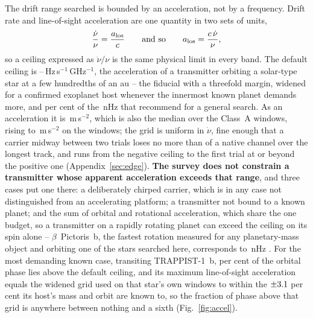 The drift range searched is bounded by an acceleration, not by a frequency.
Drift rate and line-of-sight acceleration are one quantity in two sets of
units,
%
\begin{equation}
\frac{\dot\nu}{\nu}=\frac{a_{\rm los}}{c}
\qquad\text{and so}\qquad
a_{\rm los}=\frac{c\,\dot\nu}{\nu},
\label{eq:accel}
\end{equation}
%
so a ceiling expressed as $\dot\nu/\nu$ is the same physical limit in every
band. The default ceiling is \DriftCeilLo--\DriftCeilHi\,Hz\,s$^{-1}$\,GHz$^{-1}$,
the acceleration of a transmitter orbiting a solar-type star at a few
hundredths of an au -- the \citet{Mason2025} fiducial with a threefold margin,
widened for a confirmed exoplanet host whenever the innermost known planet
demands more, and \AccelSheikhPct{} per cent of the \AccelSheikhNHz\,nHz that
\citet{Sheikh2019} recommend for a general search. As an acceleration it is
\AccelCeilMed\,m\,s$^{-2}$, which is also the median over the Class~A windows,
rising to \AccelCeilMax\,m\,s$^{-2}$ on the \AccelNWide{} \AccelWideStar{}
windows; the grid is uniform in $\dot\nu$, fine enough that a carrier midway
between two trials loses no more than \DriftGridFineHalf{} of a native channel
over the longest track, and runs from the negative ceiling to the first trial
at or beyond the positive one (Appendix~\ref{sec:edge}).
\textbf{The survey does not constrain a transmitter whose apparent acceleration
exceeds that range}, and three cases put one there: a deliberately chirped
carrier, which is in any case not distinguished from an accelerating platform;
a transmitter not bound to a known planet; and the sum of orbital and
rotational acceleration, which share the one budget, so a transmitter on a
rapidly rotating planet can exceed the ceiling on its spin alone --
$\beta$~Pictoris~b, the fastest rotation measured for any planetary-mass object
and orbiting one of the stars searched here, corresponds to
\AccelBpicRotNHz\,nHz \citep{Sheikh2019}. For the most demanding known case,
transiting TRAPPIST-1~b, \TrapPhaseHi{} per cent of the orbital phase lies
above the default ceiling, and its maximum line-of-sight acceleration equals
the widened grid used on that star's own windows to within the
$\pm3.1$ per cent its host's mass and orbit are known to, so the
fraction of phase above that grid is anywhere between nothing and a sixth
(Fig.~\ref{fig:accel}).

